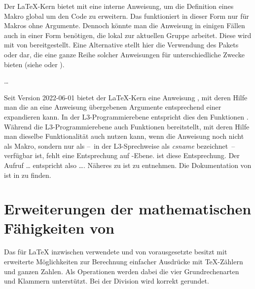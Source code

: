 \begin{Declaration}
\end{Declaration}%
Der \LaTeX-Kern bietet mit  eine interne Anweisung, um
die Definition eines Makro  global um den Code
 zu erweitern. Das funktioniert in dieser Form nur für
Makros ohne Argumente. Dennoch könnte man die Anweisung in einigen Fällen
auch in einer Form benötigen, die lokal zur aktuellen Gruppe arbeitet. Diese
wird mit  von  bereitgestellt. Eine
Alternative stellt hier die Verwendung des Pakets
 oder
 dar, die eine ganze Reihe solcher
Anweisungen für unterschiedliche Zwecke bieten (siehe
\cite{package:etoolbox} oder \cite{package:xpatch}).
%
\EndIndexGroup


\begin{Declaration}
  \dots
\end{Declaration}%
Seit Version 2022-06-01 bietet der
\LaTeX-Kern eine Anweisung , mit deren Hilfe man die an eine
Anweisung übergebenen Argumente entsprechend einer 
expandieren kann. In der L3-Programmierebene entspricht dies den Funktionen
. Während die L3-Programmierebene auch Funktionen
 bereitstellt, mit deren Hilfe man dieselbe
Funktionalität auch nutzen kann, wenn die Anweisung noch nicht als Makro,
sondern nur als  --~in der L3-Sprechweise als
\emph{csname} bezeichnet~-- verfügbar ist, fehlt eine Entsprechung auf
\LaTeXe-Ebene.  ist diese Entsprechung. Der Aufruf
\dots
entspricht also
\dots.
Näheres zu  ist \cite{latex:usrguide} zu entnehmen. Die
Dokumentation von  ist in \cite{latex:interface3} zu
finden.%
\EndIndexGroup

\section{Erweiterungen der mathematischen Fähigkeiten von \eTeX}

Das für \LaTeX{} inzwischen verwendete und von \KOMAScript{} vorausgesetzte
\eTeX{} besitzt mit  erweiterte Möglichkeiten
zur Berechnung einfacher Ausdrücke mit \TeX-Zählern und ganzen Zahlen. Als
Operationen werden dabei die vier Grundrechenarten und Klammern
unterstützt. Bei der Division wird korrekt gerundet.
%

